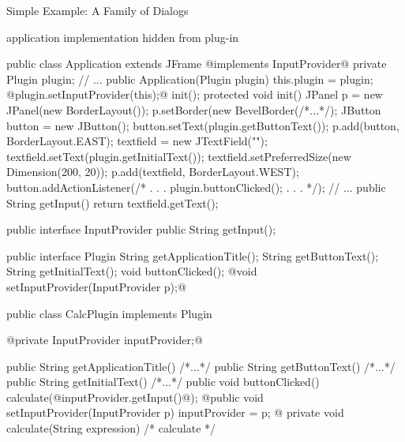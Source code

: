 \begin{frame}[fragile]{Simple Example: A Family of Dialogs}
	\begin{fancycolumns}
		\begin{note}{}
			application implementation hidden from plug-in
		\end{note}
\begin{codetight}[basicstyle=\tiny]{}
public class Application extends JFrame @implements InputProvider@ {
	private Plugin plugin;
	// ...
	public Application(Plugin plugin) {
		this.plugin = plugin;
		@plugin.setInputProvider(this);@
		init();
	}
	protected void init() {
		JPanel p = new JPanel(new BorderLayout());
		p.setBorder(new BevelBorder(/*...*/);
		JButton button = new JButton();
		button.setText(plugin.getButtonText());
		p.add(button, BorderLayout.EAST);
		textfield = new JTextField("");
		textfield.setText(plugin.getInitialText());
		textfield.setPreferredSize(new Dimension(200, 20));
		p.add(textfield, BorderLayout.WEST);		
		button.addActionListener(/* . . . plugin.buttonClicked(); . . . */);		
		// ...
	}
	public String getInput() {
		return textfield.getText();
	}
}
\end{codetight}
		\nextcolumn
{
\begin{codetight}[basicstyle=\tiny]{}
public interface InputProvider {
	public String getInput();
}
\end{codetight}
\begin{codetight}[basicstyle=\tiny]{}
public interface Plugin {
	String getApplicationTitle();
	String getButtonText();
	String getInitialText();
	void buttonClicked();
	@void setInputProvider(InputProvider p);@
}
\end{codetight}
\begin{codetight}[basicstyle=\tiny]{}
public class CalcPlugin implements Plugin {
	@private InputProvider inputProvider;@

	public String getApplicationTitle() { /*...*/ }
	public String getButtonText() { /*...*/ }
	public String getInitialText() { /*...*/ }
	public void buttonClicked() {
		calculate(@inputProvider.getInput()@);
	}
	@public void setInputProvider(InputProvider p) {
		inputProvider = p;
	}@
	private void calculate(String expression) {
		/* calculate */
	}
}
\end{codetight}
}
	\end{fancycolumns}
\end{frame}


